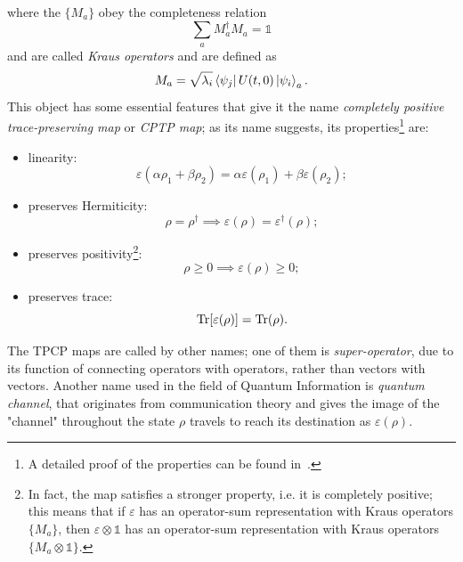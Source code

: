 where the $\{M_a\}$ obey the completeness relation
\begin{equation}
\label{compl_rel_kraus}
    \sum_a M_a^\dagger M_a = \mathds{1}
\end{equation}
and are called \emph{Kraus operators} and are defined as
\begin{equation}
    M_a = \sqrt{\lambda_i} \bra{\psi_j}U(t,0)\ket{\psi_i}_a.
\end{equation}
This object has some essential features that give it the name \emph{completely positive trace-preserving map} or \emph{CPTP map}; as its name suggests, its properties\footnote{A detailed proof of the properties can be found in~\cite{presk:quant_info}.} are:
\begin{itemize}
    \item linearity: 
    \begin{equation*}
        \varepsilon(\alpha\rho_1 + \beta\rho_2) = \alpha\varepsilon(\rho_1) + \beta\varepsilon(\rho_2);
    \end{equation*}
    \item preserves Hermiticity: 
    \begin{equation*}
        \rho = \rho^\dagger \implies \varepsilon(\rho) = \varepsilon^\dagger(\rho);
    \end{equation*}
    \item preserves positivity\footnote{In fact, the map satisfies a stronger property, i.e. it is completely positive; this means that if $\varepsilon$ has an operator-sum representation with Kraus operators $\{M_a\}$, then $\varepsilon \otimes \mathds{1}$ has an operator-sum representation with Kraus operators $\{M_a \otimes \mathds{1}\}$.}:
    \begin{equation*}
        \rho \geq 0 \implies \varepsilon(\rho) \geq 0;
    \end{equation*}
    \item preserves trace:
    \begin{equation*}
        \operatorname{Tr} [\varepsilon(\rho)] = \operatorname{Tr} (\rho).
    \end{equation*}
\end{itemize}

The TPCP maps are called by other names; one of them is \emph{super-operator}, due to its function of connecting operators with operators, rather than vectors with vectors. Another name used in the field of Quantum Information is \emph{quantum channel}, that originates from communication theory and gives the image of the "channel" throughout the state $\rho$ travels to reach its destination as $\varepsilon(\rho)$.

